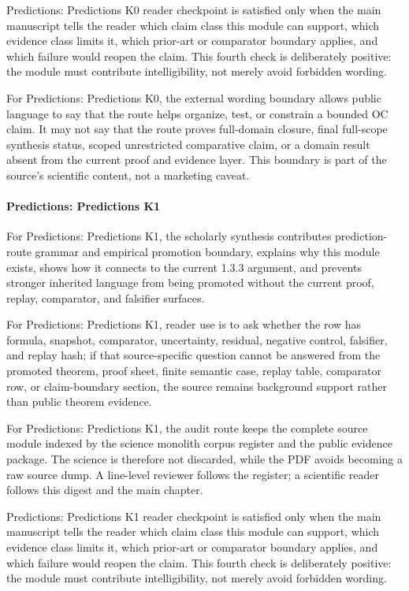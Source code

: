 Predictions: Predictions K0 reader checkpoint is satisfied only when the main manuscript tells the reader which claim class this module can support, which evidence class limits it, which prior-art or comparator boundary applies, and which failure would reopen the claim. This fourth check is deliberately positive: the module must contribute intelligibility, not merely avoid forbidden wording.


For Predictions: Predictions K0, the external wording boundary allows public language to say that the route helps organize, test, or constrain a bounded OC claim. It may not say that the route proves full-domain closure, final full-scope synthesis status, scoped unrestricted comparative claim, or a domain result absent from the current proof and evidence layer. This boundary is part of the source's scientific content, not a marketing caveat.


\paragraph{Predictions: Predictions K1}

For Predictions: Predictions K1, the scholarly synthesis contributes prediction-route grammar and empirical promotion boundary, explains why this module exists, shows how it connects to the current 1.3.3 argument, and prevents stronger inherited language from being promoted without the current proof, replay, comparator, and falsifier surfaces.


For Predictions: Predictions K1, reader use is to ask whether the row has formula, snapshot, comparator, uncertainty, residual, negative control, falsifier, and replay hash; if that source-specific question cannot be answered from the promoted theorem, proof sheet, finite semantic case, replay table, comparator row, or claim-boundary section, the source remains background support rather than public theorem evidence.


For Predictions: Predictions K1, the audit route keeps the complete source module indexed by the science monolith corpus register and the public evidence package. The science is therefore not discarded, while the PDF avoids becoming a raw source dump. A line-level reviewer follows the register; a scientific reader follows this digest and the main chapter.


Predictions: Predictions K1 reader checkpoint is satisfied only when the main manuscript tells the reader which claim class this module can support, which evidence class limits it, which prior-art or comparator boundary applies, and which failure would reopen the claim. This fourth check is deliberately positive: the module must contribute intelligibility, not merely avoid forbidden wording.


